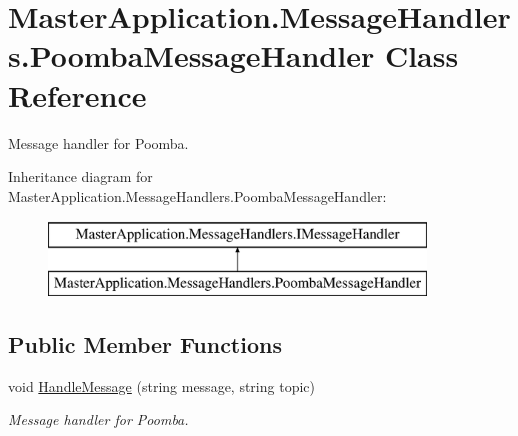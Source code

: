 \hypertarget{class_master_application_1_1_message_handlers_1_1_poomba_message_handler}{}\section{Master\+Application.\+Message\+Handlers.\+Poomba\+Message\+Handler Class Reference}
\label{class_master_application_1_1_message_handlers_1_1_poomba_message_handler}


Message handler for Poomba.  


Inheritance diagram for Master\+Application.\+Message\+Handlers.\+Poomba\+Message\+Handler\+:\begin{figure}[H]
\begin{center}
\leavevmode
\includegraphics[height=2.000000cm]{class_master_application_1_1_message_handlers_1_1_poomba_message_handler}
\end{center}
\end{figure}
\subsection*{Public Member Functions}
\begin{DoxyCompactItemize}
\item 
void \mbox{\hyperlink{class_master_application_1_1_message_handlers_1_1_poomba_message_handler_a2c49a00a1f9cad8e67d799be49b476a2}{Handle\+Message}} (string message, string topic)
\begin{DoxyCompactList}\small\item\em Message handler for Poomba. \end{DoxyCompactList}\end{DoxyCompactItemize}
